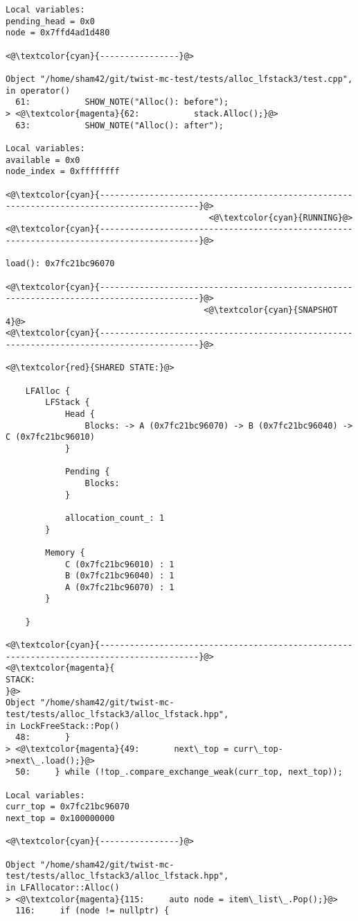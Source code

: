 \begin{adjustwidth}{-3.3cm}{-1cm}
\begin{allintypewriter}
\begin{multicols*}{2}
\begin{lstlisting}[numbers=none]
Local variables: 
pending_head = 0x0
node = 0x7ffd4ad1d480

<@\textcolor{cyan}{----------------}@>

Object "/home/sham42/git/twist-mc-test/tests/alloc_lfstack3/test.cpp",
in operator()
  61:           SHOW_NOTE("Alloc(): before");
> <@\textcolor{magenta}{62:           stack.Alloc();}@>
  63:           SHOW_NOTE("Alloc(): after");

Local variables: 
available = 0x0
node_index = 0xffffffff

<@\textcolor{cyan}{------------------------------------------------------------------------------------------}@>
                                         <@\textcolor{cyan}{RUNNING}@>
<@\textcolor{cyan}{------------------------------------------------------------------------------------------}@>

load(): 0x7fc21bc96070

<@\textcolor{cyan}{------------------------------------------------------------------------------------------}@>
                                        <@\textcolor{cyan}{SNAPSHOT 4}@>
<@\textcolor{cyan}{------------------------------------------------------------------------------------------}@>

<@\textcolor{red}{SHARED STATE:}@>

    LFAlloc {
	    LFStack {
		    Head {
			    Blocks: -> A (0x7fc21bc96070) -> B (0x7fc21bc96040) -> C (0x7fc21bc96010) 
		    }

		    Pending {
			    Blocks: 
		    }

		    allocation_count_: 1
	    }

	    Memory {
		    C (0x7fc21bc96010) : 1
		    B (0x7fc21bc96040) : 1
		    A (0x7fc21bc96070) : 1
	    }

    }

<@\textcolor{cyan}{------------------------------------------------------------------------------------------}@>
<@\textcolor{magenta}{
STACK:
}@>
Object "/home/sham42/git/twist-mc-test/tests/alloc_lfstack3/alloc_lfstack.hpp",
in LockFreeStack::Pop()
  48:       }
> <@\textcolor{magenta}{49:       next\_top = curr\_top->next\_.load();}@>
  50:     } while (!top_.compare_exchange_weak(curr_top, next_top));

Local variables: 
curr_top = 0x7fc21bc96070
next_top = 0x100000000

<@\textcolor{cyan}{----------------}@>

Object "/home/sham42/git/twist-mc-test/tests/alloc_lfstack3/alloc_lfstack.hpp",
in LFAllocator::Alloc()
> <@\textcolor{magenta}{115:     auto node = item\_list\_.Pop();}@>
  116:     if (node != nullptr) {


\end{lstlisting}
\end{multicols*}
\end{allintypewriter}
\end{adjustwidth}
